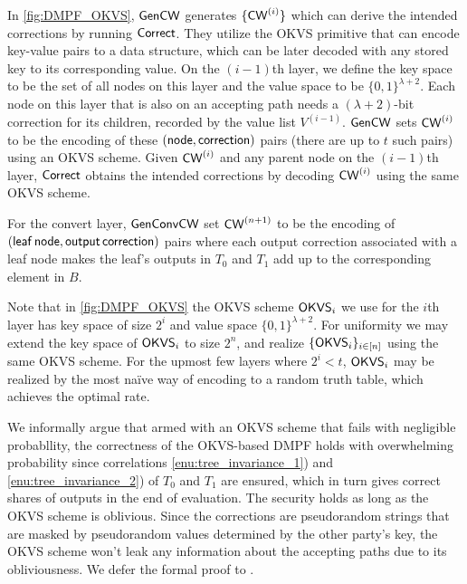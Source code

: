 In \cref{fig:DMPF_OKVS}, ${\sf Gen}{\sf CW}$ generates $\{{\sf CW}^{(i)}\}$ which can derive the intended corrections by running ${\sf Correct}$. They utilize the OKVS primitive that can encode key-value pairs to a data structure, which can be later decoded with any stored key to its corresponding value. On the $(i-1)$th layer, we define the key space to be the set of all nodes on this layer and the value space to be $\{0,1\}^{\lambda+2}$. Each node on this layer that is also on an accepting path needs a $(\lambda+2)$-bit correction for its children, recorded by the value list $V^{(i-1)}$. ${\sf Gen}{\sf CW}$ sets ${\sf CW}^{(i)}$ to be the encoding of these $\sf (node,correction)$ pairs (there are up to $t$ such pairs) using an OKVS scheme. Given ${\sf CW}^{(i)}$ and any parent node on the $(i-1)$th layer, ${\sf Correct}$ obtains the intended corrections by decoding ${\sf CW}^{(i)}$ using the same OKVS scheme. 

For the convert layer, $\sf GenConvCW$ set ${\sf CW}^{(n+1)}$ to be the encoding of $\sf (leaf\,node, output\,correction)$ pairs where each output correction associated with a leaf node makes the leaf's outputs in $T_0$ and $T_1$ add up to the corresponding element in $B$. 

Note that in \cref{fig:DMPF_OKVS} the OKVS scheme ${\sf OKVS}_i$ we use for the $i$th layer has key space of size $2^i$ and value space $\{0,1\}^{\lambda+2}$. For uniformity we may extend the key space of ${\sf OKVS}_i$ to size $2^n$, and realize $\{{\sf OKVS}_i\}_{i\in[n]}$ using the same OKVS scheme. For the upmost few layers where $2^i<t$, ${\sf OKVS}_i$ may be realized by the most na\"ive way of encoding to a random truth table, which achieves the optimal rate. 

 

We informally argue that armed with an OKVS scheme that fails with negligible probabllity, the correctness of the OKVS-based DMPF holds with overwhelming probability since correlations \ref{enu:tree_invariance_1}) and \ref{enu:tree_invariance_2}) of $T_0$ and $T_1$ are ensured, which in turn gives correct shares of outputs in the end of evaluation. The security holds as long as the OKVS scheme is oblivious. Since the corrections are pseudorandom strings that are masked by pseudorandom values determined by the other party's key, the OKVS scheme won't leak any information about the accepting paths due to its obliviousness. 
We defer the formal proof to . 

